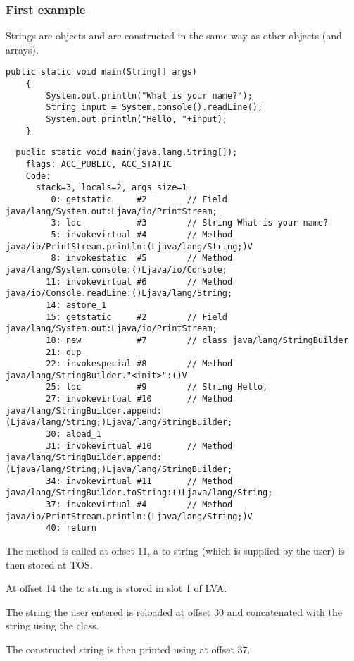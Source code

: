 \subsubsection{First example}

Strings are objects and are constructed in the same way as other objects (and arrays).


\begin{lstlisting}[style=customjava]
	public static void main(String[] args)
	{
		System.out.println("What is your name?");
		String input = System.console().readLine();
		System.out.println("Hello, "+input);
	}
\end{lstlisting}

\begin{lstlisting}
  public static void main(java.lang.String[]);
    flags: ACC_PUBLIC, ACC_STATIC
    Code:
      stack=3, locals=2, args_size=1
         0: getstatic     #2        // Field java/lang/System.out:Ljava/io/PrintStream;
         3: ldc           #3        // String What is your name?
         5: invokevirtual #4        // Method java/io/PrintStream.println:(Ljava/lang/String;)V
         8: invokestatic  #5        // Method java/lang/System.console:()Ljava/io/Console;
        11: invokevirtual #6        // Method java/io/Console.readLine:()Ljava/lang/String;
        14: astore_1      
        15: getstatic     #2        // Field java/lang/System.out:Ljava/io/PrintStream;
        18: new           #7        // class java/lang/StringBuilder
        21: dup           
        22: invokespecial #8        // Method java/lang/StringBuilder."<init>":()V
        25: ldc           #9        // String Hello, 
        27: invokevirtual #10       // Method java/lang/StringBuilder.append:(Ljava/lang/String;)Ljava/lang/StringBuilder;
        30: aload_1       
        31: invokevirtual #10       // Method java/lang/StringBuilder.append:(Ljava/lang/String;)Ljava/lang/StringBuilder;
        34: invokevirtual #11       // Method java/lang/StringBuilder.toString:()Ljava/lang/String;
        37: invokevirtual #4        // Method java/io/PrintStream.println:(Ljava/lang/String;)V
        40: return        
\end{lstlisting}

The  method is called at offset 11, a  to string (which is supplied by the user) 
is then stored at \ac{TOS}.

At offset 14 the  to string is stored in slot 1 of \ac{LVA}.

The string the user entered is reloaded at offset 30 and concatenated with the  string
using the  class.

The constructed string is then printed using  at offset 37.


